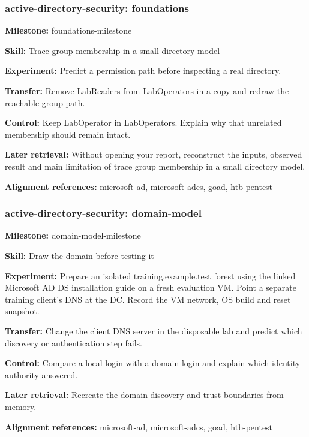\subsubsection{active-directory-security: foundations}
\noindent\textbf{Milestone:} foundations-milestone\par
\noindent\textbf{Skill:} Trace group membership in a small directory model\par
\noindent\textbf{Experiment:} Predict a permission path before inspecting a real directory.\par
\noindent\textbf{Transfer:} Remove LabReaders from LabOperators in a copy and redraw the reachable group path.\par
\noindent\textbf{Control:} Keep LabOperator in LabOperators. Explain why that unrelated membership should remain intact.\par
\noindent\textbf{Later retrieval:} Without opening your report, reconstruct the inputs, observed result and main limitation of trace group membership in a small directory model.\par
\noindent\textbf{Alignment references:} microsoft-ad, microsoft-adcs, goad, htb-pentest\par
\subsubsection{active-directory-security: domain-model}
\noindent\textbf{Milestone:} domain-model-milestone\par
\noindent\textbf{Skill:} Draw the domain before testing it\par
\noindent\textbf{Experiment:} Prepare an isolated training.example.test forest using the linked Microsoft AD DS installation guide on a fresh evaluation VM. Point a separate training client’s DNS at the DC. Record the VM network, OS build and reset snapshot.\par
\noindent\textbf{Transfer:} Change the client DNS server in the disposable lab and predict which discovery or authentication step fails.\par
\noindent\textbf{Control:} Compare a local login with a domain login and explain which identity authority answered.\par
\noindent\textbf{Later retrieval:} Recreate the domain discovery and trust boundaries from memory.\par
\noindent\textbf{Alignment references:} microsoft-ad, microsoft-adcs, goad, htb-pentest\par
